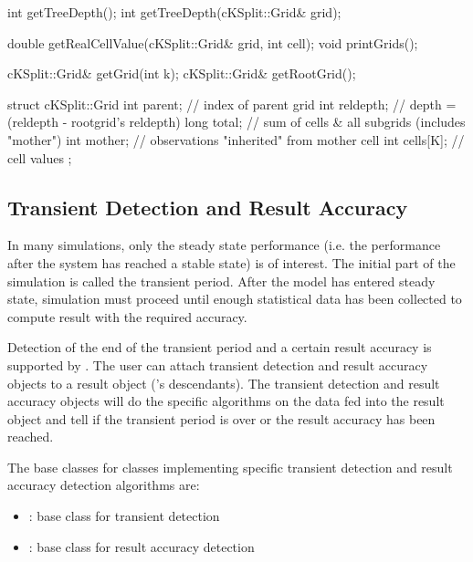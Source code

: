 \begin{cpp}
int getTreeDepth();
int getTreeDepth(cKSplit::Grid& grid);
\end{cpp}

\begin{cpp}
double getRealCellValue(cKSplit::Grid& grid, int cell);
void printGrids();
\end{cpp}

\begin{cpp}
cKSplit::Grid& getGrid(int k);
cKSplit::Grid& getRootGrid();
\end{cpp}

\begin{cpp}
struct cKSplit::Grid
{
  int parent;   // index of parent grid
  int reldepth; // depth = (reldepth - rootgrid's reldepth)
  long total;   // sum of cells & all subgrids (includes "mother")
  int mother;   // observations "inherited" from mother cell
  int cells[K]; // cell values
};
\end{cpp}



\subsection{Transient Detection and Result Accuracy}

In many simulations, only the steady state performance (i.e.
the performance after the system has reached a stable state)
is of interest. The initial part of the simulation is called
the transient period. After the model has entered steady state,
simulation must proceed until enough statistical data has been
collected to compute result with the required accuracy.


Detection of the end of the transient period and a certain result
accuracy is supported by {\opp}. The user can attach transient
detection and result accuracy objects to a result object ('s
descendants). The transient detection and result accuracy objects will
do the specific algorithms on the data fed into the result object and
tell if the transient period is over or the result accuracy has been
reached.

The base classes for classes implementing specific transient
detection and result accuracy detection algorithms are:
\begin{itemize}
\item{: base class for transient detection}
\item{: base class for result accuracy detection}
\end{itemize}


